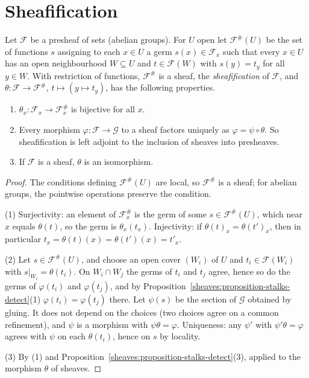 \section{Sheafification}\label{sheaves:section-sheafification}

\begin{theorem}\label{sheaves:theorem-sheafification}
Let $\mathcal{F}$ be a presheaf of sets (abelian groups). For $U$ open let $\mathcal{F}^\#(U)$ be the set of functions $s$ assigning to each $x \in U$ a germ $s(x) \in \mathcal{F}_x$
such that every $x \in U$ has an open neighbourhood $W \subseteq U$ and $t \in \mathcal{F}(W)$ with $s(y) = t_y$ for all $y \in W$. With restriction of functions,
$\mathcal{F}^\#$ is a sheaf, the \emph{sheafification} of $\mathcal{F}$, and $\theta \colon \mathcal{F} \to \mathcal{F}^\#$, $t \mapsto (y \mapsto t_y)$, has the following properties.
\begin{enumerate}
\item $\theta_x \colon \mathcal{F}_x \to \mathcal{F}^\#_x$ is bijective for all $x$.
\item Every morphism $\varphi \colon \mathcal{F} \to \mathcal{G}$ to a sheaf factors uniquely as $\varphi = \psi \circ \theta$. So sheafification is left adjoint to the inclusion of sheaves
into presheaves.
\item If $\mathcal{F}$ is a sheaf, $\theta$ is an isomorphism.
\end{enumerate}
\end{theorem}

\begin{proof}
The conditions defining $\mathcal{F}^\#(U)$ are local, so $\mathcal{F}^\#$ is a sheaf; for abelian groups, the pointwise operations preserve the condition.

(1) Surjectivity: an element of $\mathcal{F}^\#_x$ is the germ of some $s \in \mathcal{F}^\#(U)$, which near $x$ equals $\theta(t)$, so the germ is $\theta_x(t_x)$. Injectivity: if
$\theta(t)_x = \theta(t')_x$, then in particular $t_x = \theta(t)(x) = \theta(t')(x) = t'_x$.

(2) Let $s \in \mathcal{F}^\#(U)$, and choose an open cover $(W_i)$ of $U$ and $t_i \in \mathcal{F}(W_i)$ with $s|_{W_i} = \theta(t_i)$. On $W_i \cap W_j$ the germs of $t_i$ and $t_j$
agree, hence so do the germs of $\varphi(t_i)$ and $\varphi(t_j)$, and by Proposition~\ref{sheaves:proposition-stalks-detect}(1) $\varphi(t_i) = \varphi(t_j)$ there. Let $\psi(s)$ be the
section of $\mathcal{G}$ obtained by gluing. It does not depend on the choices (two choices agree on a common refinement), and $\psi$ is a morphism with $\psi\theta = \varphi$.
Uniqueness: any $\psi'$ with $\psi'\theta = \varphi$ agrees with $\psi$ on each $\theta(t_i)$, hence on $s$ by locality.

(3) By (1) and Proposition~\ref{sheaves:proposition-stalks-detect}(3), applied to the morphism $\theta$ of sheaves.
\end{proof}

